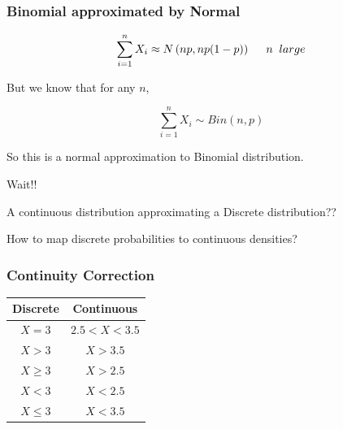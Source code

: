 \documentclass{beamer}\usepackage[]{graphicx}\usepackage[]{color}
\begin{document}
\begin{frame}[fragile]
\frametitle{Binomial approximated by Normal}

$$ \sum_{i=1}^{n} X_{i} \approx N \left (np, np(1-p) \right ) \hspace{0.5 cm} n \;\; large $$

But we know that for any $n$, 

$$\sum_{i=1}^{n} X_i \sim  Bin(n,p)$$ \pause \newline

So this is a normal approximation to Binomial distribution. \pause \newline

Wait!! \pause \newline

A continuous distribution approximating a Discrete distribution??  

How to map discrete probabilities to continuous densities?

\end{frame}

\begin{frame}[fragile]
\frametitle{Continuity Correction}

\begin{tabular}{|c|c|}
\hline
Discrete & Continuous \\ \hline
$X=3$ & $2.5 < X < 3.5$ \\ \hline
$X > 3$ & $X > 3.5$ \\ \hline
$X \geq 3$ & $ X > 2.5 $ \\ \hline
$X < 3$ & $X < 2.5$ \\ \hline
$X \leq 3$ & $X < 3.5$ \\ \hline
\end{tabular}

\end{frame}
\end{document}
